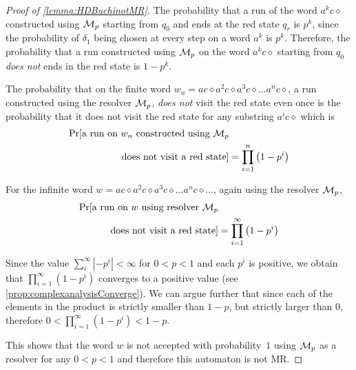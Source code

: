\begin{proof}[Proof of \cref{lemma:HDBuchinotMR}]
The probability that a run of the word $a^kc\diamond$ constructed using $\mathcal{M}_p$ starting from $q_0$ and ends at the red state $q_r$ is $p^k$, since the probability of $\delta_1$ being chosen at every step on a word $a^k$ is $p^k$. 
Therefore, the probability that a run constructed using $\mathcal{M}_p$ on the word $a^kc\diamond$ starting from $q_0$ \emph{does not} ends in the red state is $1-p^k$.

The probability that on the finite word $w_n = ac\diamond a^2c\diamond a^3c\diamond\dots a^{n}c\diamond$, a run constructed using the resolver $\mathcal{M}_p$,  \emph{does not} visit the red state even once is the probability that it does not visit the red state for any substring $a^{i}c\diamond$ which is 
\begin{align*}
\Pr[\text{a run on $w_n$ constructed using }\mathcal{M}_p&\\\text{ does not visit a red state}] &= \prod_{i=1}^n\left(1-p^{i}\right)    
\end{align*} 


For the infinite word $w = ac\diamond a^2c\diamond a^3c\diamond\dots a^{n}c\diamond\dots$, again using the resolver $\mathcal{M}_p$,
\begin{align*}
    \Pr[\text{a run on $w$ using resolver }\mathcal{M}_p & \\\text{ does not } \text{visit a red state}] & = \prod_{i=1}^\infty\left(1-p^{i}\right)
\end{align*} 

Since the value $\sum_i^\infty |-p^i| <\infty$ for $0<p<1$ and each $p^i$ is positive, we obtain that $\prod_{i=1}^\infty\left(1-p^{i}\right)$ converges to a positive value (see \cref{prop:complexanalysisConverge}). We can argue further that since each of the elements in the product is strictly smaller than $1-p$, but strictly larger than $0$, therefore $0<\prod_{i=1}^\infty\left(1-p^{i}\right)<1-p$.

This shows that the word $w$ is not accepted with probability~$1$ using $\mathcal{M}_p$ as a resolver for any $0<p<1$ and therefore this automaton is not MR.
\end{proof}

